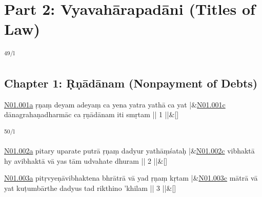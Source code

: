 \documentclass[article,12pt,a4paper]{memoir}%
\begin{document}
	  
	  
	
	    
	    \begingroup
	    \beginnumbering%
	    
	  
\part{{\protect\textenglish Part 2: Vyavahārapadāni (Titles of Law)}}\textsuperscript{\textenglish{49/l}}
	  
	
\chapter[{Chapter 1: Ṛṇādānam (Nonpayment of Debts)}][{Chapter 1: Ṛṇādānam (Nonpayment of Debts)}]{{\protect\textenglish Chapter 1: Ṛṇādānam (Nonpayment of Debts)}}
	    
	    \stanza[\smallbreak]
	  \href{http://sarit.indology.info/?cref=n\%C4\%81sm.01.001a}{N01.001a} ṛṇaṃ deyam adeyaṃ ca yena yatra yathā ca yat |&\href{http://sarit.indology.info/?cref=n\%C4\%81sm.01.001c}{N01.001c} dānagrahaṇadharmāc ca ṛṇādānam iti smṛtam || 1 ||\&[\smallbreak]
	  
	  
	  \textsuperscript{\textenglish{50/l}}
	    
	    \stanza[\smallbreak]
	  \href{http://sarit.indology.info/?cref=n\%C4\%81sm.01.002a}{N01.002a} pitary uparate putrā ṛṇaṃ dadyur yathāṃśataḥ |&\href{http://sarit.indology.info/?cref=n\%C4\%81sm.01.002c}{N01.002c} vibhaktā hy avibhaktā vā yas tām udvahate dhuram || 2 ||\&[\smallbreak]
	  
	  
	  
	    
	    \stanza[\smallbreak]
	  \href{http://sarit.indology.info/?cref=n\%C4\%81sm.01.003a}{N01.003a} pitṛvyeṇāvibhaktena bhrātrā vā yad ṛṇaṃ kṛtam |&\href{http://sarit.indology.info/?cref=n\%C4\%81sm.01.003c}{N01.003c} mātrā vā yat kuṭumbārthe dadyus tad rikthino 'khilam || 3 ||\&[\smallbreak]
	  
\end{document}
